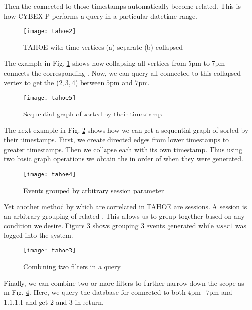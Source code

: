 Then the  connected to those timestamps automatically become related. This is how CYBEX-P performs a query in a particular datetime range.

\begin{figure}[ht]
	\texttt{[image: tahoe2]}
	\centering
	\caption{TAHOE  with time vertices (a) separate (b) collapsed}
	\label{fig:tahoe2}
\end{figure}

The example in Fig. \ref{fig:tahoe2} shows how collapsing all vertices from $5$pm to $7$pm connects the corresponding . Now, we can query all  connected to this collapsed vertex to get the  ($2, 3, 4$) between $5$pm and $7$pm.

\begin{figure}[ht!]
	\texttt{[image: tahoe5]}
	\centering
	\caption{Sequential graph of  sorted by their timestamp}
	\label{fig:tahoe5}
\end{figure}

The next example in Fig. \ref{fig:tahoe5} shows how we can get a sequential graph of  sorted by their timestamps. First, we create directed edges from lower timestamps to greater timestamps. Then we collapse each  with its own timestamp. Thus using two basic graph operations we obtain the  in order of when they were generated.

\begin{figure}[ht]
	\texttt{[image: tahoe4]} %
	\centering
	\caption{Events grouped by arbitrary session parameter}
	\label{fig:tahoe4}
\end{figure}

Yet another method by which  are correlated in TAHOE are sessions. A session is an arbitrary grouping of related . This allows us to group together  based on any condition we desire. Figure \ref{fig:tahoe4} shows grouping $3$ events generated while $user1$ was logged into the system.

\begin{figure}[ht!]
	\texttt{[image: tahoe3]}
	\centering
	\caption{Combining two filters in a query}
	\label{fig:tahoe3}
\end{figure}

Finally, we can combine two or more filters to further narrow down the scope as  in Fig. \ref{fig:tahoe3}. Here, we query the database for  connected to both $4$pm$-7$pm and $1.1.1.1$ and get  $2$ and $3$ in return.

